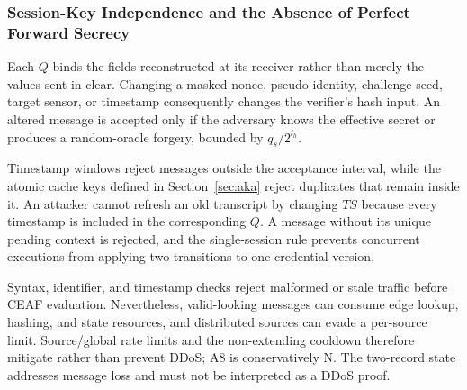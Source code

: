 \documentclass[cmc,article,submit,moreauthors,pdftex]{Definitions/tsp}
\providecommand{\DIFdel}[1]{{\protect\color{red} \scriptsize #1}} %
\providecommand{\DIFaddbegin}{} %
\providecommand{\DIFaddend}{} %
\providecommand{\DIFdelbegin}{} %
\providecommand{\DIFdelend}{} %
\begin{document}
\DIFdelbegin %
\DIFdelend \DIFaddbegin \subsubsection{Session-Key Independence and the Absence of Perfect Forward Secrecy}
\DIFaddend 

\DIFdelbegin \DIFdel{Each $Q$ binds the fields reconstructed at its receiver rather than merely the values sent in clear. Changing a masked nonce, pseudo-identity, challenge seed, target sensor, or timestamp consequently changes the verifier's hash input. An altered message is accepted only if the adversary knows the effective secret or produces a random-oracle forgery, bounded by $q_s/2^{l_h}$.
}%


\DIFdel{Timestamp windows reject messages outside the acceptance interval, while the atomic cache keys defined in Section~\ref{sec:aka} reject duplicates that remain inside it. An attacker cannot refresh an old transcript by changing $TS$ because every timestamp is included in the corresponding $Q$. A message without its unique pending context is rejected, and the single-session rule prevents concurrent executions from applying two transitions to one credential version.
}%


\DIFdel{Syntax, identifier, and timestamp checks reject malformed or stale traffic before CEAF evaluation. Nevertheless, valid-looking messages can consume edge lookup, hashing, and state resources, and distributed sources can evade a per-source limit. Source/global rate limits and the non-extending cooldown therefore mitigate rather than prevent DDoS; A8 is conservatively N. The two-record state addresses message loss and must not be interpreted as a DDoS proof.
}%
\end{document}
